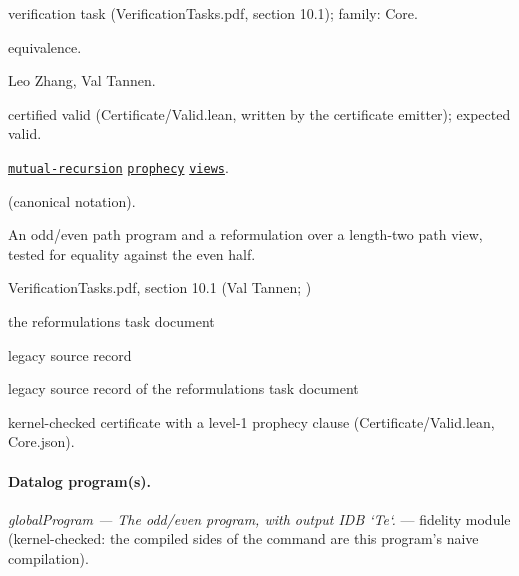 \documentclass[10pt]{article}
\begin{document}
\begin{description}[leftmargin=2.6cm,style=nextline,itemsep=1pt]

\item[Category] verification task (VerificationTasks.pdf, section 10.1); family: Core.

\item[Kind] equivalence.

\item[Contributors] Leo Zhang, Val Tannen.

\item[Status] certified valid (Certificate/Valid.lean, written by the certificate emitter); expected valid.

\item[Tags] \hyperref[tag:mutual-recursion]{\texttt{mutual-recursion}} \hyperref[tag:prophecy]{\texttt{prophecy}} \hyperref[tag:views]{\texttt{views}}.

\item[Input]  (canonical notation).

\item[Summary] An odd/even path program and a reformulation over a length-two path view, tested for equality against the even half.

\item[Sources] {\raggedright VerificationTasks.pdf, section 10.1 (Val Tannen; ) \par the reformulations task document \par legacy source record  \par legacy source record of the reformulations task document\par}

\item[Prophecy] kernel-checked certificate with a level-1 prophecy clause (Certificate/Valid.lean, Core.json).

\end{description}

\paragraph{Datalog program(s).}

{\raggedright\textit{globalProgram --- The odd/even program, with output IDB `Te`.} --- fidelity module (kernel-checked: the compiled sides of the command are this program's naive compilation).\par}
\end{document}
